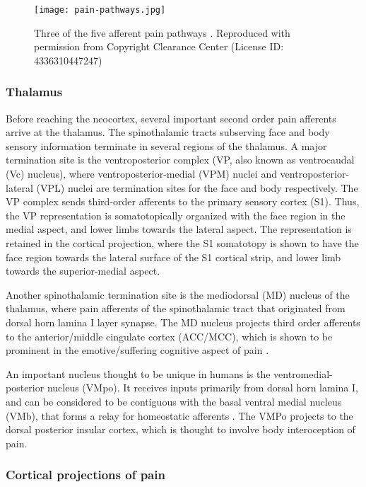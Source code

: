  \begin{figure}[ht]
 \texttt{[image: pain-pathways.jpg]}
 \centering
 \caption{Three of the five afferent pain pathways \protect\cite{kandel2000principles}. Reproduced with permission from Copyright Clearance Center (License ID: 4336310447247)}
 \label{fig:pain-pathways}
 \end{figure}
 
 
\subsubsection{Thalamus}

Before reaching the neocortex, several important second order pain afferents arrive at the thalamus. The spinothalamic tracts subserving face and body sensory information terminate in several regions of the thalamus. A major termination site is the ventroposterior complex (VP, also known as ventrocaudal (Vc) nucleus), where ventroposterior-medial (VPM) nuclei and ventroposterior-lateral (VPL) nuclei are termination sites for the face and body respectively. The VP complex sends third-order afferents to the primary sensory cortex (S1). Thus, the VP representation is somatotopically organized with the face region in the medial aspect, and lower limbs towards the lateral aspect. The representation is retained in the cortical projection, where the S1 somatotopy is shown to have the face region towards the lateral surface of the S1 cortical strip, and lower limb towards the superior-medial aspect. 

Another spinothalamic termination site is the mediodorsal (MD) nucleus of the thalamus, where pain afferents of the spinothalamic tract that originated from dorsal horn lamina I layer synapse. The MD nucleus projects third order afferents to the anterior/middle cingulate cortex (ACC/MCC), which is shown to be prominent in the emotive/suffering cognitive aspect of pain \cite{Vogt2016}.  

An important nucleus thought to be unique in humans is the ventromedial-posterior nucleus (VMpo)\cite{Willis2002,Craig2014}. It receives inputs primarily from dorsal horn lamina I, and can be considered to be contiguous with the basal ventral medial nucleus (VMb), that forms a relay for homeostatic afferents \cite{Craig2003}. The VMPo projects to the dorsal posterior insular cortex, which is thought to involve body interoception of pain.

\subsubsection{Cortical projections of pain}\label{section:neuromatrix}

